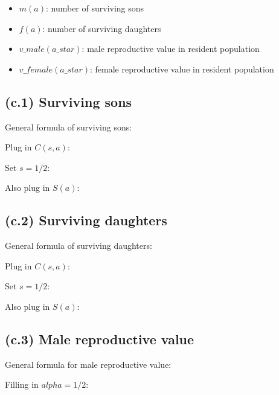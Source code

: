 \documentclass[11]{article}
\begin{document}
\begin{itemize}
  \item $m(a)$: number of surviving sons
  \item $f(a)$: number of surviving daughters
  \item $v\_male(a\_star)$: male reproductive value in resident population
  \item $v\_female(a\_star)$: female reproductive value in resident population
\end{itemize}

\subsection{(c.1) Surviving sons}

General formula of surviving sons:



Plug in $C(s,a)$:



Set $s=1/2$:



Also plug in $S(a)$:



\subsection{(c.2) Surviving daughters}

General formula of surviving daughters:



Plug in $C(s,a)$:



Set $s=1/2$:



Also plug in $S(a)$:



\subsection{(c.3) Male reproductive value}

General formula for male reproductive value:



Filling in $alpha=1/2$:
\end{document}
